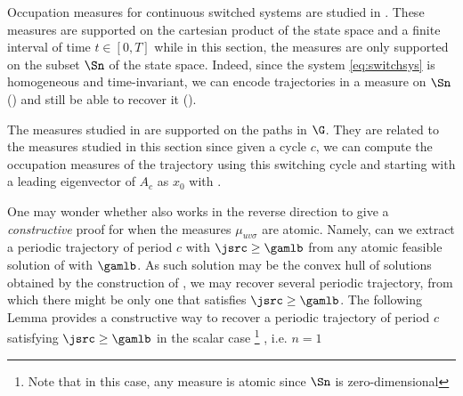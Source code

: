 \documentclass[11pt,twoside,a4paper,openright]{uclouvain-thesis}
\begin{document}
\begin{myrem}
  Occupation measures for continuous switched systems are studied in \cite{claeys2016modal}.
  These measures are supported on the cartesian product of the state space and a finite interval of time $t \in [0, T]$
  while in this section, the measures are only supported on the subset $\Sn$ of the state space.
  Indeed, since the system \eqref{eq:switchsys} is homogeneous and time-invariant, we can encode trajectories in a measure on $\Sn$ () and
  still be able to recover it ().

  The measures studied in \cite{hare2011explicit} are supported on the paths in $\G$.
  They are related to the measures studied in this section since given a cycle $c$,
  we can compute the occupation measures of the trajectory using this switching cycle and starting with a leading eigenvector of $A_c$ as $x_0$ with .
\end{myrem}



One may wonder whether  also works in the reverse direction to give a \emph{constructive} proof for  when the measures $\mu_{uv\sigma}$ are atomic.
Namely, can we extract a periodic trajectory of period $c$ with $\jsrc \geq \gamlb$ from any atomic feasible solution of  with $\gamlb$.
As such solution may be the convex hull of solutions obtained by the construction of , we may recover several periodic trajectory, from which there might be only one that satisfies $\jsrc \geq \gamlb$.
The following Lemma provides a constructive way to recover a periodic trajectory of period $c$ satisfying $\jsrc \geq \gamlb$ in the scalar case%
\footnote{Note that in this case, any measure is atomic since $\Sn$ is zero-dimensional}%
, i.e. $n = 1$%
\end{document}
